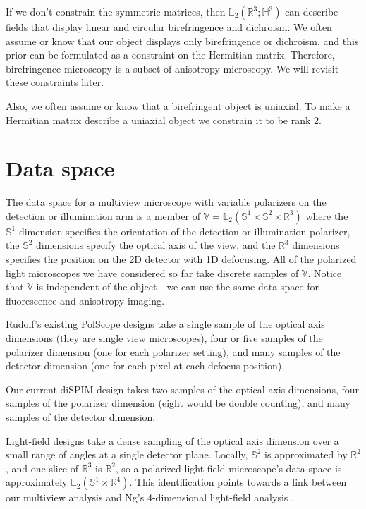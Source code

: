 \documentclass[11pt]{article}
\providecommand{\mbb}[1]{\mathbb{#1}}
\begin{document}
If we don't constrain the symmetric matrices, then
$\mbb{L}_2(\mbb{R}^3; \mbb{H}^3)$ can describe fields that display linear and
circular birefringence and dichroism. We often assume or know that our object
displays only birefringence or dichroism, and this prior can be formulated as a
constraint on the Hermitian matrix. Therefore, birefringence microscopy is a
subset of anisotropy microscopy. We will revisit these constraints later.

Also, we often assume or know that a birefringent object is uniaxial. To make
a Hermitian matrix describe a uniaxial object we constrain it to be rank 2.

\section{Data space}
The data space for a multiview microscope with variable polarizers on the
detection or illumination arm is a member of
$\mbb{V} = \mbb{L}_2(\mbb{S}^1\times\mbb{S}^2\times\mbb{R}^3)$ where the
$\mbb{S}^1$ dimension specifies the orientation of the detection or illumination
polarizer, the $\mbb{S}^2$ dimensions specify the optical axis of the view, and
the $\mbb{R}^3$ dimensions specifies the position on the 2D detector with 1D
defocusing. All of the polarized light microscopes we have considered so far
take discrete samples of $\mbb{V}$. Notice that $\mbb{V}$ is independent of the
object---we can use the same data space for fluorescence and anisotropy imaging.

Rudolf's existing PolScope designs take a single sample of the optical axis
dimensions (they are single view microscopes), four or five samples of the
polarizer dimension (one for each polarizer setting), and many samples of the
detector dimension (one for each pixel at each defocus position).

Our current diSPIM design takes two samples of the optical axis dimensions, four
samples of the polarizer dimension (eight would be double counting), and many
samples of the detector dimension. 

Light-field designs take a dense sampling of the optical axis dimension over a
small range of angles at a single detector plane. Locally, $\mbb{S}^2$ is
approximated by $\mbb{R}^2$, and one slice of $\mbb{R}^3$ is $\mbb{R}^2$, so a
polarized light-field microscope's data space is approximately
$\mbb{L}_2(\mbb{S}^1\times\mbb{R}^4)$. This identification points towards a link
between our multiview analysis and Ng's 4-dimensional light-field analysis
\cite{ng2005}.
\end{document}
